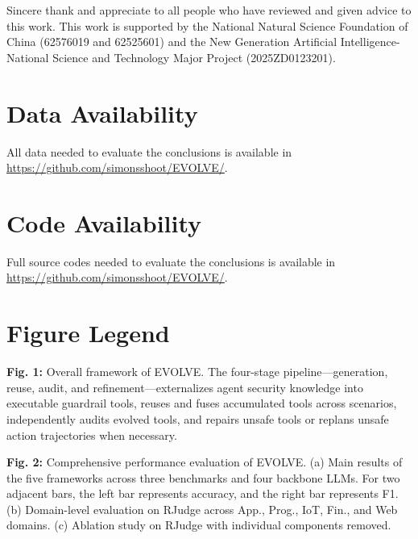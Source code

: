 \documentclass[pdflatex,sn-mathphys-num]{sn-jnl}%
\theoremstyle{thmstyleone}%
\theoremstyle{thmstyletwo}%
\theoremstyle{thmstylethree}%
\begin{document}


% 



\backmatter






Sincere thank and appreciate to all people who have reviewed and given advice to this work. This work is supported by the National Natural Science Foundation
of China (62576019 and 62525601) and the New Generation Artificial Intelligence-
National Science and Technology Major Project (2025ZD0123201).

\section{Data Availability}
All data needed to evaluate the conclusions is available in \url{https://github.com/simonsshoot/EVOLVE/}.
\section{Code Availability}
Full source codes needed to evaluate the conclusions is available in \url{https://github.com/simonsshoot/EVOLVE/}.
\newpage

\newpage
\section*{Figure Legend}
\textbf{Fig. 1:} Overall framework of EVOLVE. The four-stage pipeline---generation, reuse, audit, and refinement---externalizes agent security knowledge into executable guardrail tools, reuses and fuses accumulated tools across scenarios, independently audits evolved tools, and repairs unsafe tools or replans unsafe action trajectories when necessary.

\textbf{Fig. 2:} Comprehensive performance evaluation of EVOLVE. (a) Main results of the five frameworks across three benchmarks and four backbone LLMs. For two adjacent bars, the left bar represents accuracy, and the right bar represents F1. (b) Domain-level evaluation on RJudge across App., Prog., IoT, Fin., and Web domains. (c) Ablation study on RJudge with individual components removed.
\end{document}
